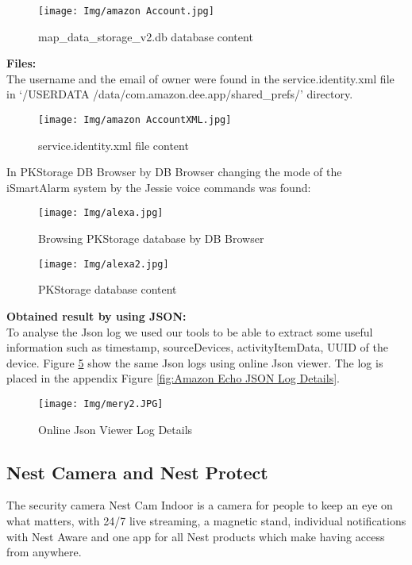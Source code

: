 \documentclass{easychair}
\begin{document}
\begin{figure}[H]
    \centering
    \texttt{[image: Img/amazon Account.jpg]}
    \caption{map\_data\_storage\_v2.db database content}
    \label{fig:my_label}
\end{figure}

\textbf{Files:}\\

The username and the email of owner were found in the service.identity.xml file in ‘/USERDATA /data/com.amazon.dee.app/shared\_prefs/’ directory.\\

\begin{figure}[H]
    \centering
    \texttt{[image: Img/amazon AccountXML.jpg]}
    \caption{service.identity.xml file content}
    \label{fig:my_label}
\end{figure}

In PKStorage DB Browser by DB Browser changing the mode of the iSmartAlarm system by the Jessie voice commands was found:\\
\begin{figure}[H]
    \centering
    \texttt{[image: Img/alexa.jpg]}
    \caption{Browsing PKStorage database by DB Browser}
    \label{fig:my_label}
\end{figure}
\begin{figure}[H]
    \centering
    \texttt{[image: Img/alexa2.jpg]}
    \caption{PKStorage database content}
    \label{fig:my_label}
\end{figure}

\textbf{Obtained result by using JSON:}\\
To analyse the Json log we used our tools to be able to extract some useful information such as timestamp, sourceDevices, activityItemData, UUID of the device. Figure \ref{fig:JV} show the same Json logs using online Json viewer. The log is placed in the appendix Figure  \ref{fig:Amazon Echo JSON Log Details}.

\begin{figure}[H]
    \centering
    \texttt{[image: Img/mery2.JPG]}
    \caption{Online Json Viewer Log Details}
    \label{fig:JV}
\end{figure}

\subsection{Nest Camera and Nest Protect}

The security camera Nest Cam Indoor is a camera for people to keep an eye on what matters, with 24/7 live streaming, a magnetic stand, individual notifications with Nest Aware and one app for all Nest products which make having access from anywhere\cite{pari_10}.\\
\end{document}
